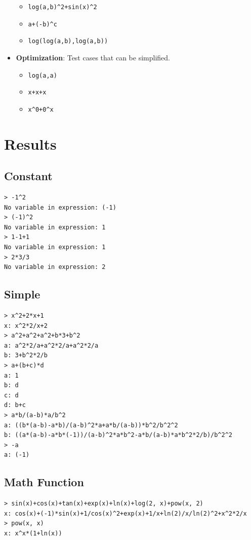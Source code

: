 \documentclass[a4paper,oneside]{book}
\begin{document}
\begin{itemize}
\begin{itemize}
              \item \verb|log(a,b)^2+sin(x)^2|
              \item \verb|a+(-b)^c|
              \item \verb|log(log(a,b),log(a,b))|
          \end{itemize}
    \item \textbf{Optimization}: Test cases that can be simplified.
          \begin{itemize}
              \item \verb|log(a,a)|
              \item \verb|x+x+x|
              \item \verb|x^0+0^x|
          \end{itemize}
\end{itemize}

\section{Results}

\subsection{Constant}

\begin{verbatim}
> -1^2
No variable in expression: (-1)
> (-1)^2
No variable in expression: 1
> 1-1+1
No variable in expression: 1
> 2*3/3
No variable in expression: 2
\end{verbatim}

\subsection{Simple}

\begin{verbatim}
> x^2+2*x+1
x: x^2*2/x+2
> a^2+a^2+a^2+b*3+b^2
a: a^2*2/a+a^2*2/a+a^2*2/a
b: 3+b^2*2/b
> a+(b+c)*d
a: 1
b: d
c: d
d: b+c
> a*b/(a-b)*a/b^2
a: ((b*(a-b)-a*b)/(a-b)^2*a+a*b/(a-b))*b^2/b^2^2
b: ((a*(a-b)-a*b*(-1))/(a-b)^2*a*b^2-a*b/(a-b)*a*b^2*2/b)/b^2^2
> -a
a: (-1)
\end{verbatim}

\subsection{Math Function}

\begin{verbatim}
> sin(x)+cos(x)+tan(x)+exp(x)+ln(x)+log(2, x)+pow(x, 2)
x: cos(x)+(-1)*sin(x)+1/cos(x)^2+exp(x)+1/x+ln(2)/x/ln(2)^2+x^2*2/x
> pow(x, x)
x: x^x*(1+ln(x))
\end{verbatim}
\end{document}

